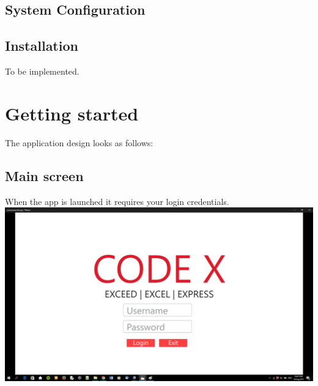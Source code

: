 \documentclass[a4paper,10pt]{article}
\begin{document}
\subsection{System Configuration}

\subsection{Installation}
To be implemented.

\section{Getting started}
	The application design looks as follows: \\
	\subsection{Main screen}
	When the app is launched it requires your login credentials.\\
	{\centering\includegraphics[width=15cm, scale=0.5]{smarctsearch1.jpg}}
\end{document}
